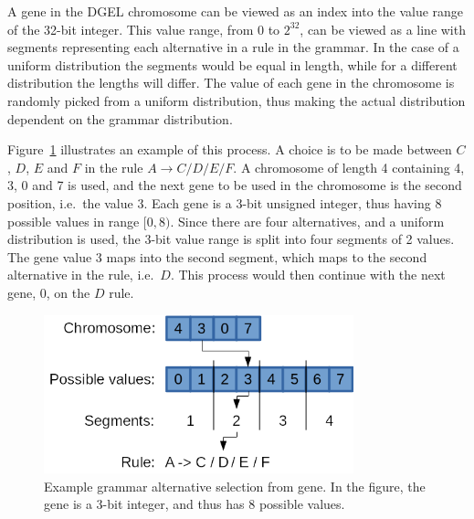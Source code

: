 A gene in the \gls{DGEL} chromosome can be viewed as an index into the value range of the 32-bit integer.
This value range, from $0$ to $2^{32}$, can be viewed as a line with segments representing each alternative in a rule in the grammar.
In the case of a uniform distribution the segments would be equal in length, while for a different distribution the lengths will differ.
The value of each gene in the chromosome is randomly picked from a uniform distribution, thus making the actual distribution dependent on the grammar distribution.

Figure~\ref{fig:gene} illustrates an example of this process.
A choice is to be made between $C$, $D$, $E$ and $F$ in the rule $A \rightarrow C / D / E / F$.
A chromosome of length 4 containing 4, 3, 0 and 7 is used, and the next gene to be used in the chromosome is the second position, i.e.\ the value 3.
Each gene is a 3-bit unsigned integer, thus having 8 possible values in range $[0, 8)$.
Since there are four alternatives, and a uniform distribution is used, the 3-bit value range is split into four segments of 2 values.
The gene value 3 maps into the second segment, which maps to the second alternative in the rule, i.e.\ $D$.
This process would then continue with the next gene, 0, on the $D$ rule.

\begin{figure}
    \centering
    \includegraphics[width=0.8\textwidth]{figures/gene}
    \caption[Example grammar alternative selection from gene]{Example grammar alternative selection from gene. In the figure, the gene is a 3-bit integer, and thus has 8 possible values.}
    \label{fig:gene}
\end{figure}

